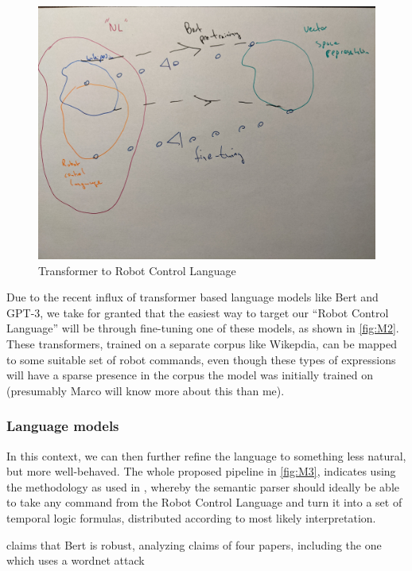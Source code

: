 \documentclass{article}
\begin{document}
\begin{figure}
\centering
\includegraphics[width=150mm]{pics/two.jpg}
\caption{Transformer to Robot Control Language}\label{fig:M2}
\end{figure}

Due to the recent influx of transformer based language models like Bert and
GPT-3, we take for granted that the easiest way to target our ``Robot Control
Language'' will be through fine-tuning one of these models, as shown in
\autoref{fig:M2}. These transformers, trained on a separate corpus like
Wikepdia, can be mapped to some suitable set of robot commands, even though
these types of expressions will have a sparse presence in the corpus the model
was initially trained on (presumably Marco will know more about this than me).

\subsubsection{Language models}

In this context, we can then further refine the language to something less
natural, but more well-behaved. The whole proposed pipeline in \autoref{fig:M3},
indicates using the methodology as used in \cite{fewShotSem}, whereby the
semantic parser should ideally be able to take any command from the Robot
Control Language and turn it into a set of temporal logic formulas, distributed
according to most likely interpretation.

\cite{hauser2021bert}  claims that Bert is robust, analyzing claims of four
 papers, including the one which uses a wordnet attack
\end{document}
